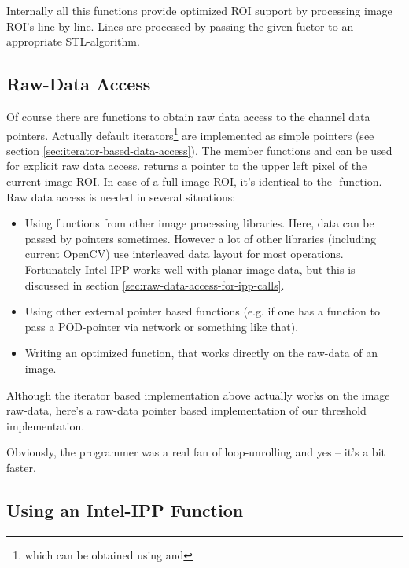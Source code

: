 Internally all this functions provide optimized ROI support by processing image ROI's line by line. Lines are processed by passing the given fuctor to an appropriate STL-algorithm.  



\subsection{Raw-Data Access}
Of course there are functions to obtain raw data access to the channel data pointers. Actually default iterators\footnote{which can be obtained using  and } are implemented as simple pointers (see section \ref{sec:iterator-based-data-access}).
The member functions  and  can be used for explicit raw data access.  returns a pointer to the upper left pixel of the current image ROI. In case of a full image ROI, it's identical to the -function. Raw data access is needed in several situations:
\begin{itemize}
\item Using functions from other image processing libraries. Here, data can be passed by pointers sometimes. However a lot of other libraries (including current OpenCV) use interleaved data layout for most operations. Fortunately Intel IPP works well with planar image data, but this is discussed in section \ref{sec:raw-data-access-for-ipp-calls}.
\item Using other external pointer based functions (e.g. if one has a function to pass a POD-pointer via network or something like that).
\item Writing an optimized function, that works directly on the raw-data of an image. 
\end{itemize}

Although the iterator based implementation above actually works on the image raw-data, here's a raw-data pointer based implementation of our threshold implementation.


Obviously, the programmer was a real fan of loop-unrolling and yes -- it's a bit faster.


\subsection{Using an Intel-IPP Function\label{sec:raw-data-access-for-ipp-calls}}

